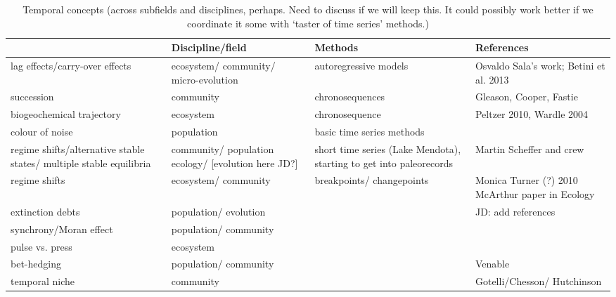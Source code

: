 \documentclass[11pt,a4paper,oneside]{article}
\begin{document}
\newpage
\begin{center}
\begin{table}
\caption{Temporal concepts (across subfields and disciplines, perhaps. Need to discuss if we will keep this. It could possibly work better if we coordinate it some with `taster of time series' methods.)} 
    \begin{tabular}{ | p{4 cm} | p{3 cm}  | p{3 cm}  | p{4cm} |}
    \hline
{\bf Concept & Discipline/field & Methods & References} \\ \hline \hline
lag effects/carry-over effects	& ecosystem/ community/ micro-evolution & autoregressive models & Osvaldo Sala's work; Betini et al. 2013 \\ \hline
succession & community & chronosequences & Gleason, Cooper, Fastie \\ \hline
biogeochemical trajectory & ecosystem  & chronosequence  & Peltzer 2010, Wardle 2004 \\ \hline
colour of noise  & population  & basic time series methods & \\ \hline	
regime shifts/alternative stable states/ multiple stable equilibria  & community/ population ecology/ [evolution here JD?]   & short time series (Lake Mendota), starting to get into paleorecords  & Martin Scheffer and crew \\ \hline
regime shifts  & ecosystem/ community   & breakpoints/ changepoints  & Monica Turner (?) 2010 McArthur paper in Ecology \\ \hline
extinction debts & population/ evolution & & 	JD: add references \\ \hline
synchrony/Moran effect & population/ community & & \\ \hline	
pulse vs. press & ecosystem & & \\ \hline		
bet-hedging & population/ community & & Venable \\ \hline
temporal niche & community	& & Gotelli/Chesson/ Hutchinson \\ \hline
    \hline
    \end{tabular}
\end{table}
\end{center}
\end{document}
